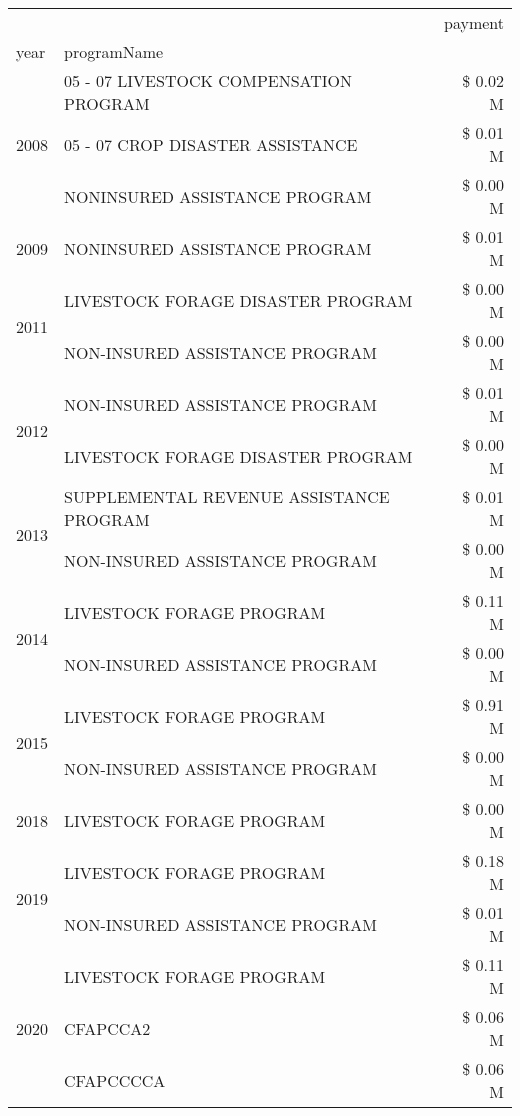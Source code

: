 \begin{tabular}{llr}
\toprule
 &  & payment \\
year & programName &  \\
\midrule
\multirow[t]{3}{*}{2008} & 05 - 07 LIVESTOCK COMPENSATION PROGRAM & \$ 0.02 M \\
 & 05 - 07 CROP DISASTER ASSISTANCE & \$ 0.01 M \\
 & NONINSURED ASSISTANCE PROGRAM & \$ 0.00 M \\
\cline{1-3}
2009 & NONINSURED ASSISTANCE PROGRAM & \$ 0.01 M \\
\cline{1-3}
\multirow[t]{2}{*}{2011} & LIVESTOCK FORAGE DISASTER PROGRAM & \$ 0.00 M \\
 & NON-INSURED ASSISTANCE PROGRAM & \$ 0.00 M \\
\cline{1-3}
\multirow[t]{2}{*}{2012} & NON-INSURED ASSISTANCE PROGRAM & \$ 0.01 M \\
 & LIVESTOCK FORAGE DISASTER PROGRAM & \$ 0.00 M \\
\cline{1-3}
\multirow[t]{2}{*}{2013} & SUPPLEMENTAL REVENUE ASSISTANCE PROGRAM & \$ 0.01 M \\
 & NON-INSURED ASSISTANCE PROGRAM & \$ 0.00 M \\
\cline{1-3}
\multirow[t]{2}{*}{2014} & LIVESTOCK FORAGE PROGRAM & \$ 0.11 M \\
 & NON-INSURED ASSISTANCE PROGRAM & \$ 0.00 M \\
\cline{1-3}
\multirow[t]{2}{*}{2015} & LIVESTOCK FORAGE PROGRAM & \$ 0.91 M \\
 & NON-INSURED ASSISTANCE PROGRAM & \$ 0.00 M \\
\cline{1-3}
2018 & LIVESTOCK FORAGE PROGRAM & \$ 0.00 M \\
\cline{1-3}
\multirow[t]{2}{*}{2019} & LIVESTOCK FORAGE PROGRAM & \$ 0.18 M \\
 & NON-INSURED ASSISTANCE PROGRAM & \$ 0.01 M \\
\cline{1-3}
\multirow[t]{3}{*}{2020} & LIVESTOCK FORAGE PROGRAM & \$ 0.11 M \\
 & CFAPCCA2 & \$ 0.06 M \\
 & CFAPCCCCA & \$ 0.06 M \\
\cline{1-3}
\bottomrule
\end{tabular}
